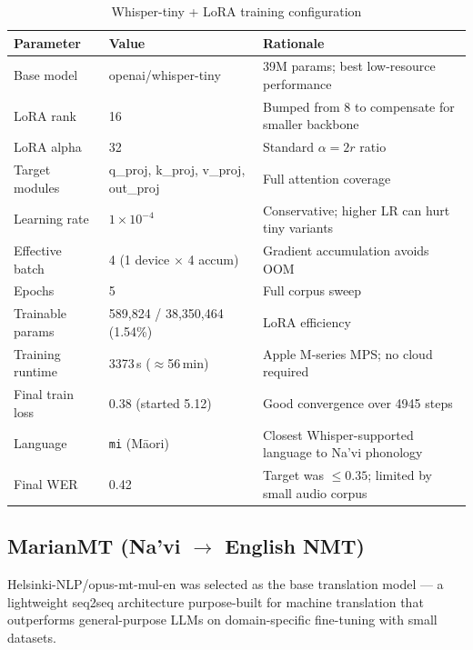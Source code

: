 \documentclass[12pt,a4paper]{article}
\begin{document}
\begin{table}[H]
  \centering
  \caption{Whisper-tiny + LoRA training configuration}
  \begin{tabular}{@{}L{3.5cm}L{4.5cm}L{6cm}@{}}
    \toprule
    \textbf{Parameter} & \textbf{Value} & \textbf{Rationale} \\
    \midrule
    Base model         & openai/whisper-tiny          & 39M params; best low-resource performance \cite{springer2024} \\
    LoRA rank          & 16                           & Bumped from 8 to compensate for smaller backbone \\
    LoRA alpha         & 32                           & Standard $\alpha = 2r$ ratio \\
    Target modules     & q\_proj, k\_proj, v\_proj, out\_proj & Full attention coverage \\
    Learning rate      & $1 \times 10^{-4}$           & Conservative; higher LR can hurt tiny variants \\
    Effective batch    & 4 (1 device $\times$ 4 accum)& Gradient accumulation avoids OOM \\
    Epochs             & 5                            & Full corpus sweep \\
    Trainable params   & 589,824 / 38,350,464 (1.54\%)& LoRA efficiency \\
    Training runtime   & 3373\,s ($\approx$56\,min)   & Apple M-series MPS; no cloud required \\
    Final train loss   & 0.38 (started 5.12)          & Good convergence over 4945 steps \\
    Language           & \texttt{mi} (M\={a}ori)      & Closest Whisper-supported language to Na'vi phonology \\
    Final WER          & 0.42                         & Target was $\leq 0.35$; limited by small audio corpus \\
    \bottomrule
  \end{tabular}
\end{table}

\subsection{MarianMT (Na'vi $\rightarrow$ English NMT)}

Helsinki-NLP/opus-mt-mul-en was selected as the base translation model --- a lightweight
seq2seq architecture purpose-built for machine translation that outperforms general-purpose
LLMs on domain-specific fine-tuning with small datasets.
\end{document}
